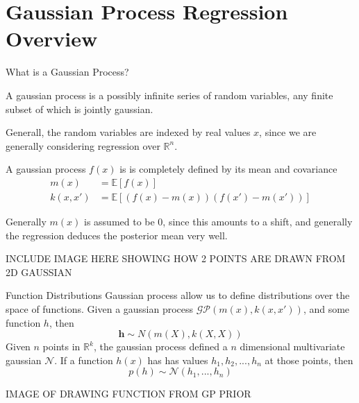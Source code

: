 \documentclass[10pt]{beamer}
\begin{document}
\section[GP Regression]{Gaussian Process Regression Overview}
\label{sec:gauss-proc-regr}

\begin{frame}{What is a Gaussian Process?}
  \begin{definition}
    A gaussian process is a possibly infinite series of random variables, any finite subset of which is jointly gaussian.
  \end{definition}


  Generall, the random variables are indexed by real values $x$, since we are generally considering regression over $\mathbb{R}^{n}$.

  A gaussian process $f(x)$ is is completely defined by its mean and covariance
  \begin{equation}
    \begin{split}
      m(x) &= \mathbb{E} \left[ f(x) \right] \\
      k(x,x') &= \mathbb{E} \left[ \left( f(x) - m(x) \right)  \left( f(x') - m(x') \right)\right] 
    \end{split}
  \end{equation}

  \begin{alertenv}
    Generally $m(x)$ is assumed to be 0, since this amounts to a shift, and generally the regression deduces the posterior mean very well. 
  \end{alertenv}

  INCLUDE IMAGE HERE SHOWING HOW 2 POINTS ARE DRAWN FROM 2D GAUSSIAN
  
\end{frame}

\begin{frame}{Function Distributions}
  Gaussian process allow us to define distributions over the space of functions. Given a gaussian process $\mathcal{GP} \left( m(x) , k(x,x') \right)$, and some function $h$, then
  \begin{equation}
    \mathbf{h} \sim N(m(X) , k(X,X))
  \end{equation}
  Given $n$ points in $\mathbb{R}^{k}$, the gaussian process defined a $n$ dimensional multivariate gaussian $\mathcal{N}$. If a function $h(x)$ has has values $h_1,h_2,...,h_{n}$ at those points, then
  \begin{equation}
    p \left( h \right) \sim \mathcal{N}(h_{1}, ..., h_{n})
  \end{equation}

  IMAGE OF DRAWING FUNCTION FROM GP PRIOR
\end{frame}
\end{document}
